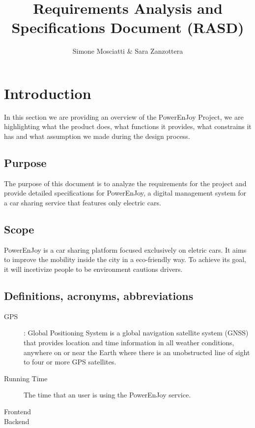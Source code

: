 \documentclass[11pt]{article} %
\title{Requirements Analysis and Specifications Document (RASD)}
\author{Simone Mosciatti \& Sara Zanzottera}
\newcommand{\pe}{PowerEnJoy }
\newcommand{\pecomma}{PowerEnJoy, }
\begin{document}
\maketitle
\newpage
\tableofcontents
\newpage


\section{Introduction}

In this section we are providing an overview of the \pe Project, we are highlighting what the product does, what functions it provides, what constrains it has and what assumption we made during the design process.

  \subsection{Purpose}
  
The purpose of this document is to analyze the requirements for the project and provide detailed specifications for \pecomma a digital management system for a car sharing service that features only electric cars.
  
  \subsection{Scope}
  
\pe is a car sharing platform focused exclusively on eletric cars. It aims to improve the mobility inside the city in a eco-friendly way. To achieve its goal, it will incetivize people to be environment cautions drivers.

\subsection{Definitions, acronyms, abbreviations}
  \begin{description}
  	\item[GPS]: Global Positioning System is a global navigation satellite system (GNSS) that provides location and time information in all weather conditions, anywhere on or near the Earth where there is an unobstructed line of sight to four or more GPS satellites.
  	\item[Running Time] The time that an user is using the \pe service.
  	\item[Frontend]
  	\item[Backend]
  \end{description}
  
\end{document}
